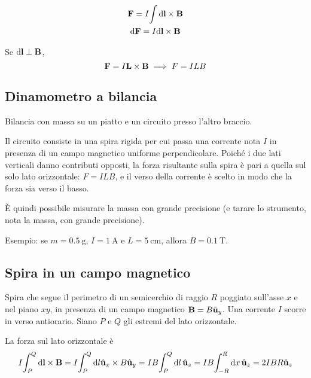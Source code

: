 \begin{subequations}
\begin{gather}
    \mathbf{F} = I \!\int \mathrm{d} \mathbf{l} \times \mathbf{B} \\
    \mathrm{d} \mathbf{F} = I \mathrm{d} \mathbf{l} \times \mathbf{B}
\end{gather}
\end{subequations}

Se $\mathrm{d} \mathbf{l} \perp \mathbf{B}$,
\begin{equation}
    \mathbf{F} = I \mathbf{L} \times \mathbf{B}
    \implies
    F = I L B
\end{equation}


\subsection{Dinamometro a bilancia}


Bilancia con massa su un piatto e un circuito presso l'altro braccio.

Il circuito consiste in una spira rigida per cui passa una corrente nota $I$ in presenza di un campo magnetico uniforme perpendicolare.
Poiché i due lati verticali danno contributi opposti, la forza risultante sulla spira è pari a quella sul solo lato orizzontale: $F = ILB$, e il verso della corrente è scelto in modo che la forza sia verso il basso.

È quindi possibile misurare la massa con grande precisione (e tarare lo strumento, nota la massa, con grande precisione).

Esempio: se $m = \qty{0.5}{\gram}$, $I = \qty{1}{\ampere}$ e $L = \qty{5}{\centi\metre}$, allora $B = \qty{0.1}{\tesla}$.

\subsection{Spira in un campo magnetico}


Spira che segue il perimetro di un semicerchio di raggio $R$ poggiato sull'asse $x$ e nel piano $xy$, in presenza di un campo magnetico $\mathbf{B} = B \hat{\mathbf{u}}_{y}$.
Una corrente $I$ scorre in verso antiorario. Siano $P$ e $Q$ gli estremi del lato orizzontale.

La forza sul lato orizzontale è
\begin{equation}
    I \!\int_P^Q \mathrm{d} \mathbf{l} \times \mathbf{B}
    = I \!\int_P^Q \mathrm{d} l \hat{\mathbf{u}}_{x} \times B \hat{\mathbf{u}}_{y}
    = I B \!\int_P^Q \mathrm{d} l \, \hat{\mathbf{u}}_{z}
    = I B \!\int_{-R}^R \mathrm{d} x \, \hat{\mathbf{u}}_{z}
    = 2IBR \hat{\mathbf{u}}_{z}
\end{equation}

